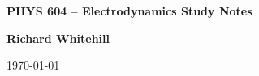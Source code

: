 \begin{titlepage}

    \begin{center}

        \vspace*{1cm}
        \Huge
        \textbf{PHYS 604 -- Electrodynamics Study Notes}
        
        \LARGE
        \vfill
        \textbf{Richard Whitehill}
        
        \Large
        \vspace{0.5cm}
        \today


    \end{center}

\end{titlepage}

